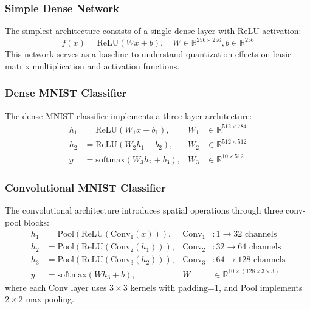 \documentclass[twocolumn]{article}
\begin{document}
\subsubsection{Simple Dense Network}
The simplest architecture consists of a single dense layer with ReLU activation:
\begin{equation*}
f(x) = \text{ReLU}(Wx + b), \quad W \in \mathbb{R}^{256 \times 256}, b \in \mathbb{R}^{256}
\end{equation*}
This network serves as a baseline to understand quantization effects on basic matrix multiplication and activation functions.

\subsubsection{Dense MNIST Classifier}
The dense MNIST classifier implements a three-layer architecture:
\begin{align*}
h_1 &= \text{ReLU}(W_1x + b_1), & W_1 &\in \mathbb{R}^{512 \times 784} \\
h_2 &= \text{ReLU}(W_2h_1 + b_2), & W_2 &\in \mathbb{R}^{512 \times 512} \\
y &= \text{softmax}(W_3h_2 + b_3), & W_3 &\in \mathbb{R}^{10 \times 512}
\end{align*}

\subsubsection{Convolutional MNIST Classifier}
The convolutional architecture introduces spatial operations through three conv-pool blocks:
\begin{align*}
h_1 &= \text{Pool}(\text{ReLU}(\text{Conv}_1(x))), & \text{Conv}_1 &: 1 \rightarrow 32 \text{ channels} \\
h_2 &= \text{Pool}(\text{ReLU}(\text{Conv}_2(h_1))), & \text{Conv}_2 &: 32 \rightarrow 64 \text{ channels} \\
h_3 &= \text{Pool}(\text{ReLU}(\text{Conv}_3(h_2))), & \text{Conv}_3 &: 64 \rightarrow 128 \text{ channels} \\
y &= \text{softmax}(Wh_3 + b), & W &\in \mathbb{R}^{10 \times (128 \times 3 \times 3)}
\end{align*}
where each Conv layer uses $3\times3$ kernels with padding=1, and Pool implements $2\times2$ max pooling.
\end{document}
